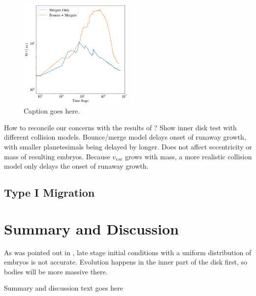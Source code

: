\documentclass[twocolumn]{aastex63}
\begin{document}
\begin{figure}
\begin{center}
    \includegraphics[width=0.5\textwidth]{figures/frag_evo.png}
    \caption{Caption goes here.\label{fig:frag_evo}}
\end{center}
\end{figure}


How to reconcile our concerns with the results of \citet{wallace17}? Show inner disk test with different collision models. Bounce/merge model delays onset of runaway growth, with smaller planetesimals being delayed by longer. Does not affect eccentricity or mass of resulting embryos. Because $v_{esc}$ grows with mass, a more realistic collision model only delays the onset of runaway growth.

\subsection{Type I Migration}

\section{Summary and Discussion} \label{sec:discuss}

As was pointed out in \citet{clement20},  late stage initial conditions with a uniform distribution of embryos is not accurate. Evolution happens in the inner part of the disk first, so bodies will be more massive there.

Summary and discussion text goes here



\clearpage
\end{document}
